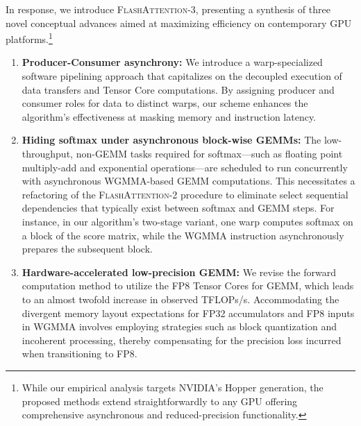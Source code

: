 In response, we introduce \textsc{FlashAttention-3}, presenting a synthesis of three novel conceptual advances aimed at maximizing efficiency on contemporary GPU platforms.\footnote{While our empirical analysis targets NVIDIA’s Hopper generation, the proposed methods extend straightforwardly to any GPU offering comprehensive asynchronous and reduced-precision functionality.}

\begin{enumerate}

\item \textbf{Producer-Consumer asynchrony:} We introduce a warp-specialized software pipelining approach that capitalizes on the decoupled execution of data transfers and Tensor Core computations. By assigning producer and consumer roles for data to distinct warps, our scheme enhances the algorithm’s effectiveness at masking memory and instruction latency.
\item \textbf{Hiding softmax under asynchronous block-wise GEMMs:} The low-throughput, non-GEMM tasks required for softmax—such as floating point multiply-add and exponential operations—are scheduled to run concurrently with asynchronous WGMMA-based GEMM computations. This necessitates a refactoring of the \textsc{FlashAttention-2} procedure to eliminate select sequential dependencies that typically exist between softmax and GEMM steps. For instance, in our algorithm’s two-stage variant, one warp computes softmax on a block of the score matrix, while the WGMMA instruction asynchronously prepares the subsequent block.
\item \textbf{Hardware-accelerated low-precision GEMM:} We revise the forward computation method to utilize the FP8 Tensor Cores for GEMM, which leads to an almost twofold increase in observed TFLOPs/s. Accommodating the divergent memory layout expectations for FP32 accumulators and FP8 inputs in WGMMA involves employing strategies such as block quantization and incoherent processing, thereby compensating for the precision loss incurred when transitioning to FP8.


\end{enumerate}
